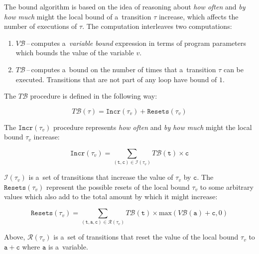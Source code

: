 \documentclass{ExcelAtFIT}
\begin{document}
The bound algorithm is based on the idea of
reasoning about \textit{how often} and
\textit{by how much} might the local bound of
a~transition $\tau$ increase, which affects
the number of executions of $\tau$. The computation
interleaves two computations:
\vspace{-2.5mm}
\begin{enumerate}
    \item $V\mathcal{B}$\,--\,computes
    a~\textit{variable bound} expression in terms of
    program parameters which bounds the value of the
    variable $v$.

    \item $T\mathcal{B}$\,--\,computes a~bound on the
    number of times that a~transition $\tau$ can be
    executed. Transitions that are not part of any
    loop have bound of $1$.
\vspace{-2.5mm}
\end{enumerate}
The $T\mathcal{B}$ procedure is defined in the following
way:
\setlength{\belowdisplayskip}{3pt}
\setlength{\abovedisplayskip}{3pt}
\begin{linenomath}
\begin{equation*}
T\mathcal{B}(\tau) =
\mathtt{Incr}(\tau_v) +
\mathtt{Resets}(\tau_v)
\end{equation*}
\end{linenomath}
The $\mathtt{Incr}(\tau_v)$ procedure
represents \textit{how often}
and \textit{by how much} might the local bound
$\tau_v$ increase:
\begin{linenomath}
\begin{equation*}
\mathtt{Incr}(\tau_v)=
\sum\limits_{(\mathtt{t, c})\in
\mathcal{I}(\tau_v)}
T\mathcal{B}(\mathtt{t})\times\mathtt{c}
\label{eq:incr_procedure}
\end{equation*}
\end{linenomath}
$\mathcal{I}(\tau_v)$ is a~set of transitions that
increase the value of $\tau_v$ by $\mathtt{c}$. The
$\mathtt{Resets}(\tau_v)$ 
represent the possible resets of the local bound $\tau_v$ to some
arbitrary values which also add to the total amount by
which it might increase:
\begin{linenomath}
\begin{equation*}
\mathtt{Resets}(\tau_v)=
\sum\limits_{(\mathtt{t, a, c})\in
\mathcal{R}(\tau_v)}
T\mathcal{B}(\mathtt{t})\times
\mathrm{max}(V\mathcal{B}(\mathtt{a}) + \mathtt{c}, 0)
\label{eq:resets_procedure}
\end{equation*}
\end{linenomath}
Above, $\mathcal{R}(\tau_v)$ is a~set of transitions
that reset the value of the local bound $\tau_v$ to
$\mathtt{a} + \mathtt{c}$ where $\mathtt{a}$ is
a~variable.
\end{document}
